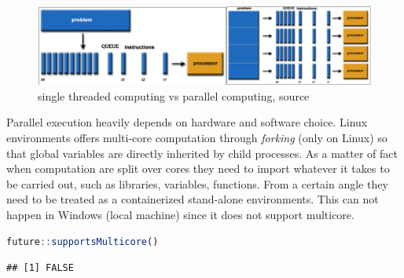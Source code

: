 \documentclass[
  12pt,
  a4paper,
  oneside]{book}
\theoremstyle{definition}
\theoremstyle{definition}
\theoremstyle{definition}
\theoremstyle{remark}
\begin{document}
\begin{figure}
\centering
\includegraphics{images/parallel_problem.jpg}
\caption{\label{fig:singlethreaded}single threaded computing vs parallel computing, \citet{barney} source}
\end{figure}

Parallel execution heavily depends on hardware and software choice. Linux environments offers multi-core computation through \emph{forking} \citep{wiki:forking} (only on Linux) so that global variables are directly inherited by child processes. As a matter of fact when computation are split over cores they need to import whatever it takes to be carried out, such as libraries, variables, functions. From a certain angle they need to be treated as a containerized stand-alone environments. This can not happen in Windows (local machine) since it does not support multicore.

\begin{lstlisting}[language=R]
future::supportsMulticore()
\end{lstlisting}

\begin{lstlisting}
## [1] FALSE
\end{lstlisting}
\end{document}
